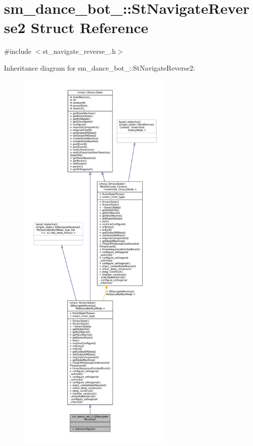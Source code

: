 \hypertarget{structsm__dance__bot__2_1_1StNavigateReverse2}{}\section{sm\+\_\+dance\+\_\+bot\+\_\+:\+:St\+Navigate\+Reverse2 Struct Reference}
\label{structsm__dance__bot__2_1_1StNavigateReverse2}


{\ttfamily \#include $<$st\+\_\+navigate\+\_\+reverse\+\_.\+h$>$}



Inheritance diagram for sm\+\_\+dance\+\_\+bot\+\_\+:\+:St\+Navigate\+Reverse2\+:
\nopagebreak
\begin{figure}[H]
\begin{center}
\leavevmode
\includegraphics[height=550pt]{structsm__dance__bot__2_1_1StNavigateReverse2__inherit__graph}
\end{center}
\end{figure}


